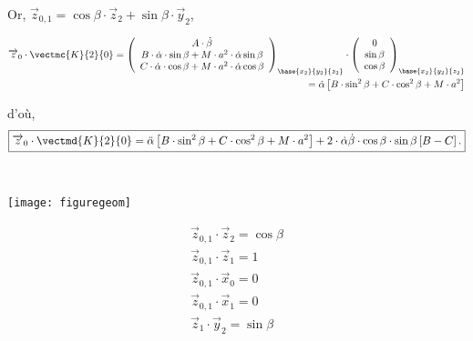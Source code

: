 \begin{multicols}{2}
\begin{corrige}
Or, $\overrightarrow{z}_{0,1}=\cos\beta\cdot \overrightarrow{z}_2+\sin\beta\cdot \overrightarrow{y}_2$,

\begin{align*}
\overrightarrow{z}_0\cdot\vectmc{K}{2}{0}=
\left(
\begin{array}{c}
A\cdot \dot{\beta}\\
B\cdot \dot{\alpha}\cdot \sin\beta+M\cdot a^2\cdot \dot{\alpha}\sin\beta\\
C\cdot \dot{\alpha}\cdot \cos\beta+M\cdot a^2\cdot \dot{\alpha}\cos\beta\\
\end{array}
\right)_{\base{{x}_2}{{y}_2}{{z}_2}}
\cdot
\left(
\begin{array}{c}
0\\
\sin\beta\\
\cos\beta\\
\end{array}
\right)_{\base{{x}_2}{{y}_2}{{z}_2}}
\\
=\dot{\alpha}\left[B\cdot \sin^2\beta+C\cdot \cos^2\beta+M\cdot a^2\right]
\end{align*}

d'où,
\begin{align*}
\boxed{
\overrightarrow{z}_0\cdot \vectmd{K}{2}{0}=\ddot{\alpha}\left[B\cdot \sin^2\beta+C\cdot \cos^2\beta+M\cdot a^2\right]
+2\cdot\dot{\alpha}\dot{\beta}\cdot \cos\beta\cdot \sin\beta\left[B-C\right].
}
\end{align*}
\end{corrige}
\else
\fi



\ifprof
\begin{corrige} ~\\

\begin{minipage}{0.5\textwidth}
\begin{center}
\texttt{[image: figuregeom]}
\end{center}
\end{minipage}
\begin{minipage}{0.5\textwidth}
\begin{align*}
\overrightarrow{z}_{0,1}\cdot \overrightarrow{z}_2=\cos\beta\\
\overrightarrow{z}_{0,1}\cdot \overrightarrow{z}_1=1\\
\overrightarrow{z}_{0,1}\cdot \overrightarrow{x}_0=0\\
\overrightarrow{z}_{0,1}\cdot \overrightarrow{x}_1=0\\
\overrightarrow{z}_1\cdot \overrightarrow{y}_2=\sin\beta\\
\end{align*}
\end{minipage}


\end{corrige}
\end{multicols}
